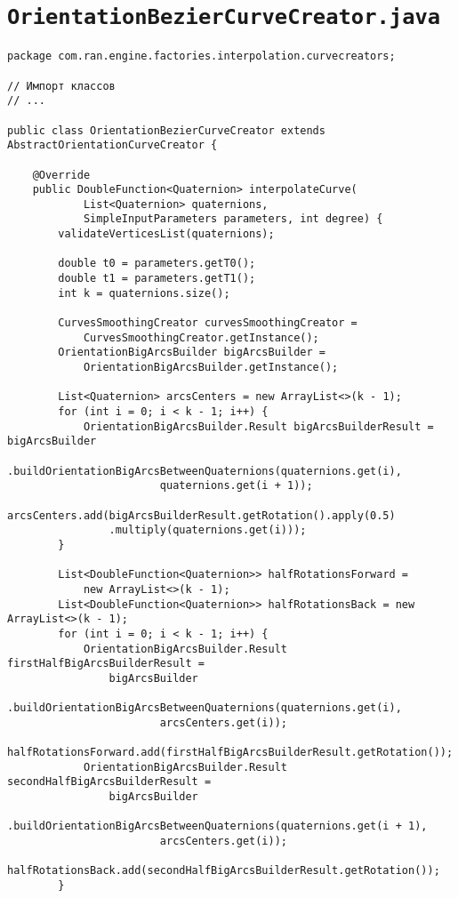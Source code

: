 \section*{\texttt{OrientationBezierCurveCreator.java}}
\begin{verbatim}
package com.ran.engine.factories.interpolation.curvecreators;

// Импорт классов
// ...

public class OrientationBezierCurveCreator extends AbstractOrientationCurveCreator {

    @Override
    public DoubleFunction<Quaternion> interpolateCurve(
            List<Quaternion> quaternions,
            SimpleInputParameters parameters, int degree) {
        validateVerticesList(quaternions);

        double t0 = parameters.getT0();
        double t1 = parameters.getT1();
        int k = quaternions.size();

        CurvesSmoothingCreator curvesSmoothingCreator =
            CurvesSmoothingCreator.getInstance();
        OrientationBigArcsBuilder bigArcsBuilder =
            OrientationBigArcsBuilder.getInstance();

        List<Quaternion> arcsCenters = new ArrayList<>(k - 1);
        for (int i = 0; i < k - 1; i++) {
            OrientationBigArcsBuilder.Result bigArcsBuilderResult = bigArcsBuilder
                    .buildOrientationBigArcsBetweenQuaternions(quaternions.get(i),
                        quaternions.get(i + 1));
            arcsCenters.add(bigArcsBuilderResult.getRotation().apply(0.5)
                .multiply(quaternions.get(i)));
        }

        List<DoubleFunction<Quaternion>> halfRotationsForward =
            new ArrayList<>(k - 1);
        List<DoubleFunction<Quaternion>> halfRotationsBack = new ArrayList<>(k - 1);
        for (int i = 0; i < k - 1; i++) {
            OrientationBigArcsBuilder.Result firstHalfBigArcsBuilderResult =
                bigArcsBuilder
                    .buildOrientationBigArcsBetweenQuaternions(quaternions.get(i),
                        arcsCenters.get(i));
            halfRotationsForward.add(firstHalfBigArcsBuilderResult.getRotation());
            OrientationBigArcsBuilder.Result secondHalfBigArcsBuilderResult =
                bigArcsBuilder
                    .buildOrientationBigArcsBetweenQuaternions(quaternions.get(i + 1),
                        arcsCenters.get(i));
            halfRotationsBack.add(secondHalfBigArcsBuilderResult.getRotation());
        }


\end{verbatim}
